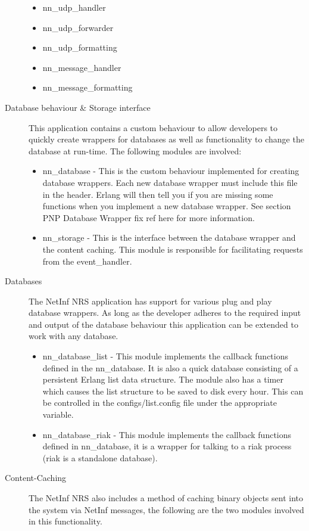 \begin{description}
\begin{itemize}
\item nn\_udp\_handler
\item nn\_udp\_forwarder
\item nn\_udp\_formatting
\item nn\_message\_handler
\item nn\_message\_formatting
\end{itemize}
\item[Database behaviour \& Storage interface]
This application contains a custom behaviour to allow developers to quickly create wrappers for databases as well as functionality to change the database at run-time. The following modules are involved:
\begin {itemize}
\item nn\_database - This is the custom behaviour implemented for creating database wrappers. Each new database wrapper must include this file in the header. Erlang will then tell you if you are missing some functions when you implement a new database wrapper. See section  PNP Database Wrapper {fix ref here} for more information.
\item nn\_storage - This is the interface between the database wrapper and the content caching. This module is responsible for facilitating requests from the event\_handler.
\end{itemize}
\item[Databases]
The NetInf NRS application has support for various plug and play database wrappers. As long as the developer adheres to the required input and output of the database behaviour this application can be extended to work with any database. 
\begin{itemize}
\item nn\_database\_list - This module implements the callback functions defined in the nn\_database. It is also a quick database consisting of a persistent Erlang list data structure. The module also has a timer which causes the list structure to be saved to disk every hour. This can be controlled in the configs/list.config file under the appropriate variable.
\item nn\_database\_riak - This module implements the callback functions defined in nn\_database, it is a wrapper for talking to a riak process (riak is a standalone database).
\end{itemize}
\item[Content-Caching]
The NetInf NRS also includes a method of caching binary objects sent into the system via NetInf messages, the following are the two modules involved in this functionality.

\end{description}
